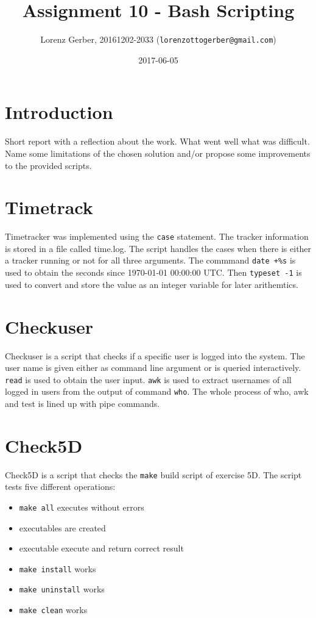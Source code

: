 \documentclass[a4paper,11pt,twoside]{article}
\title{Assignment 10 - Bash Scripting }
\author{Lorenz Gerber, 20161202-2033 ({\tt{lorenzottogerber@gmail.com}})}
\date{2017-06-05}
\begin{document}
\lstset{language=C}
\maketitle
\thispagestyle{empty}
\newpage

\clearpage
{}

\section{Introduction}
Short report with a reflection about the work. What went well what was difficult. Name some limitations of the chosen solution and/or propose some improvements to the provided scripts.

\section{Timetrack}
Timetracker was implemented using the \verb+case+ statement. The tracker information is stored in a file called time.log. The script handles the cases when there is either a tracker running or not for all three arguments.
The commmand \verb?date +%s? is used to obtain the seconds since 1970-01-01 00:00:00 UTC. Then \verb?typeset -1? is used to convert and store the value as an integer variable for later arithemtics.

\section{Checkuser}
Checkuser is a script that checks if a specific user is logged into the system. The user name is given either as command line argument or is queried interactively. \verb+read+ is used to obtain the user input. \verb+awk+ is used to extract usernames of all logged in users from the output of command \verb+who+. The whole process of who, awk and test is lined up with pipe commands.

\section{Check5D}
Check5D is a script that checks the \verb+make+ build script of exercise 5D. The script tests five different operations:
\begin{itemize}
\item \verb+make all+ executes without errors
\item executables are created
\item executable execute and return correct result
\item \verb+make install+ works
\item \verb+make uninstall+ works
\item \verb+make clean+ works
\end{itemize}
\end{document}

